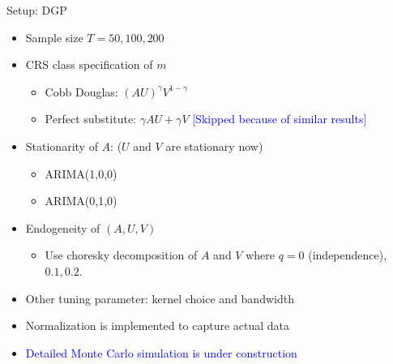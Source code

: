 \documentclass[aspectratio=169]{beamer}
\begin{document}
\begin{frame}{Setup: DGP}
\begin{itemize}
    \item Sample size $T=50,100, 200$
    \item CRS class specification of $m$
    \begin{itemize}
        \item Cobb Douglas: $(AU)^{\gamma}V^{1-\gamma}$
        \item Perfect substitute: $\gamma AU+\gamma V$ \textcolor{blue}{[Skipped because of similar results]}
    \end{itemize}
    \item Stationarity of $A$: ($U$ and $V$ are stationary now)
    \begin{itemize}
        \item ARIMA(1,0,0)
        \item ARIMA(0,1,0)
    \end{itemize}
    \item Endogeneity of $(A,U,V)$
    \begin{itemize}
        \item Use choresky decomposition of $A$ and $V$ where $q=0$ (independence), $0.1, 0.2$.
    \end{itemize}
    \item Other tuning parameter: kernel choice and bandwidth 
    \item Normalization is implemented to capture actual data
    \item \textcolor{blue}{Detailed Monte Carlo simulation is under construction}
\end{itemize}
    
\end{frame}
\end{document}
